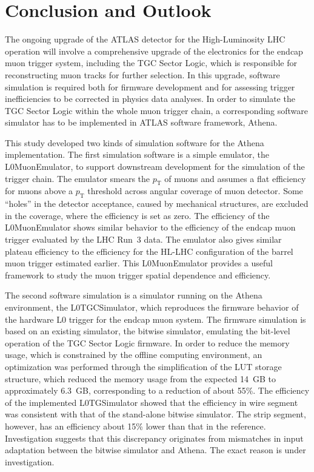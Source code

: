 \chapter{Conclusion and Outlook} \label{ch:conclusion}
The ongoing upgrade of the ATLAS detector for the High-Luminosity LHC operation will involve a comprehensive upgrade of the electronics for the endcap muon trigger system, including the TGC Sector Logic, which is responsible for reconstructing muon tracks for further selection. In this upgrade, software simulation is required both for firmware development and for assessing trigger inefficiencies to be corrected in physics data analyses. In order to simulate the TGC Sector Logic within the whole muon trigger chain, a corresponding software simulator has to be implemented in ATLAS software framework, Athena.

This study developed two kinds of simulation software for the Athena implementation. The first simulation software is a simple emulator, the L0MuonEmulator, to support downstream development for the simulation of the trigger chain. The emulator smears the $p_{\mathrm{T}}$ of muons and assumes a flat efficiency for muons above a $p_{\mathrm{T}}$ threshold across angular coverage of muon detector. Some ``holes'' in the detector acceptance, caused by mechanical structures, are excluded in the coverage, where the efficiency is set as zero. The efficiency of the L0MuonEmulator shows similar behavior to the efficiency of the endcap muon trigger evaluated by the LHC Run~3 data. The emulator also gives similar plateau efficiency to the efficiency for the HL-LHC configuration of the barrel muon trigger estimated earlier. This L0MuonEmulator provides a useful framework to study the muon trigger spatial dependence and efficiency.

The second software simulation is a simulator running on the Athena environment, the L0TGCSimulator, which reproduces the firmware behavior of the hardware L0 trigger for the endcap muon system. The firmware simulation is based on an existing simulator, the bitwise simulator, emulating the bit-level operation of the TGC Sector Logic firmware. In order to reduce the memory usage, which is constrained by the offline computing environment, an optimization was performed through the simplification of the LUT storage structure, which reduced the memory usage from the expected 14~GB to approximately 6.3~GB, corresponding to a reduction of about 55\%. The efficiency of the implemented L0TGSimulator showed that the efficiency in wire segment was consistent with that of the stand-alone bitwise simulator. The strip segment, however, has an efficiency about 15\% lower than that in the reference. Investigation suggests that this discrepancy originates from mismatches in input adaptation between the bitwise simulator and Athena. The exact reason is under investigation.

